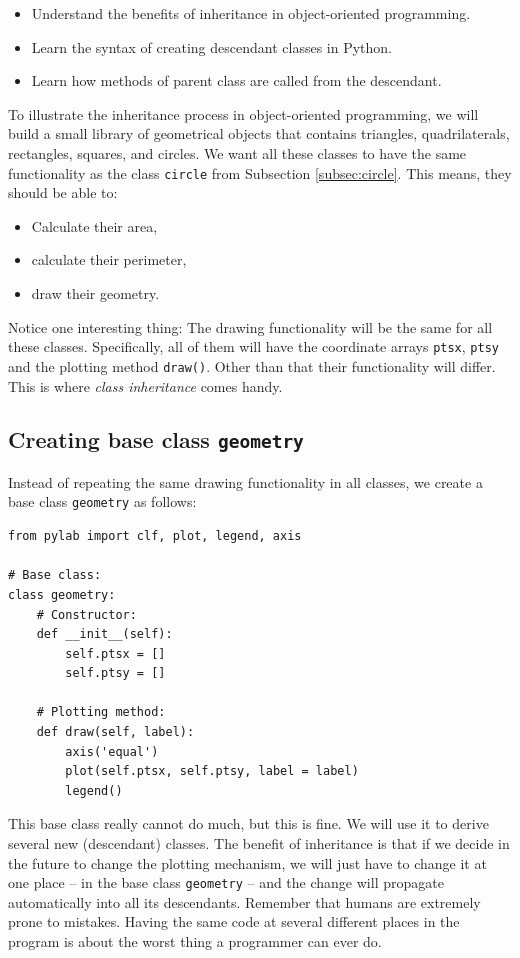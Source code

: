 \begin{itemize}
\item Understand the benefits of inheritance in object-oriented programming.
\item Learn the syntax of creating descendant classes in Python.
\item Learn how methods of parent class are called from the descendant. 
\end{itemize}
To illustrate the inheritance process in object-oriented programming, we will
build a small library of geometrical objects that contains 
triangles, quadrilaterals, rectangles, squares, and circles. 
We want all 
these classes to have the same functionality as the class {\tt circle} from 
Subsection \ref{subsec:circle}. This means, they should be able to:
\begin{itemize}
\item Calculate their area,
\item calculate their perimeter,
\item draw their geometry.
\end{itemize}
Notice one interesting thing: The drawing functionality will be 
the same for all these classes. Specifically, all of them will have the coordinate 
arrays {\tt ptsx}, {\tt ptsy} and the plotting method {\tt draw()}. Other than 
that their functionality will differ. This is where {\em class inheritance} comes
handy.

\subsection{Creating base class {\tt geometry}}

Instead of repeating the same drawing functionality in all classes, we create 
a base class {\tt geometry} as follows:

\begin{verbatim}
from pylab import clf, plot, legend, axis

# Base class:
class geometry:
    # Constructor:
    def __init__(self):
        self.ptsx = []
        self.ptsy = []
      
    # Plotting method:
    def draw(self, label):
        axis('equal')
        plot(self.ptsx, self.ptsy, label = label)
        legend()
\end{verbatim}
This base class really cannot do much, but this is fine. We will use it to 
derive several new (descendant) classes. The benefit of inheritance is that if 
we decide in the future to change the plotting mechanism, we will just have to change it at 
one place -- in the base class {\tt geometry} -- and the change will propagate automatically 
into all its descendants. Remember that humans are extremely prone to mistakes. Having the 
same code at several different places in the program is about the worst thing a programmer 
can ever do. 

